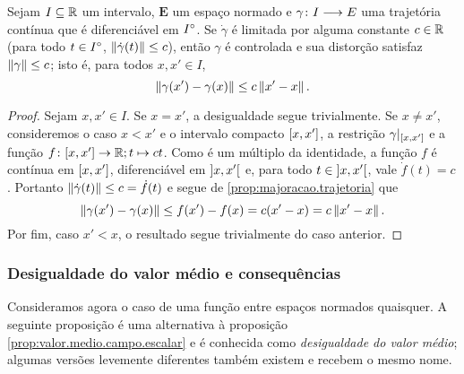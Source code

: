 \begin{proposition}
\label{prop:derivada.limitada.trajetoria.controlada}
Sejam $I \subseteq \mathbb{R}$ um intervalo, $\bm E$ um espaço normado e ${\gamma}\colon {I} \longrightarrow {E}$ uma trajetória contínua que é diferenciável em ${I}^\circ$. Se $\dot \gamma$ é limitada por alguma constante $c \in \mathbb{R}$ (para todo $t \in {I}^\circ$, $\left\Vert{\dot \gamma(t)}\right\Vert \leq c$), então $\gamma$ é controlada e sua distorção satisfaz $\left\Vert{\gamma}\right\Vert \leq c$; isto é, para todos $x,x' \in I$,
	\begin{equation*}
	\left\Vert{\gamma(x') - \gamma(x)}\right\Vert \leq c\left\Vert{x' - x}\right\Vert.
	\end{equation*}
\end{proposition}
\begin{proof}
Sejam $x,x' \in I$. Se $x=x'$, a desigualdade segue trivialmente. Se $x \neq x'$, consideremos o caso $x < x'$ e o intervalo compacto $\left[{x},{x'}\right]$, a restrição $\gamma|_{\left[{x},{x'}\right]}$ e a função ${f} \colon {\left[{x},{x'}\right]} \to {\mathbb{R}}; {t} \mapsto ct$. Como é um múltiplo da identidade, a função $f$ é contínua em $\left[{x},{x'}\right]$, diferenciável em $\left]{x},{x'}\right[$ e, para todo $t \in \left]{x},{x'}\right[$, vale $\dot f(t) = c$. Portanto $\left\Vert{\dot \gamma(t)}\right\Vert \leq c = \dot f(t)$ e segue de \ref{prop:majoracao.trajetoria} que
	\begin{equation*}
	\left\Vert{\gamma(x') - \gamma(x)}\right\Vert \leq f(x') - f(x) = c(x' - x) = c \left\Vert{x' - x}\right\Vert.
	\end{equation*}
Por fim, caso $x' < x$, o resultado segue trivialmente do caso anterior.
\end{proof}

\subsubsection{Desigualdade do valor médio e consequências}

Consideramos agora o caso de uma função entre espaços normados quaisquer. A seguinte proposição é uma alternativa à proposição \ref{prop:valor.medio.campo.escalar} e é conhecida como \textit{desigualdade do valor médio}; algumas versões levemente diferentes também existem e recebem o mesmo nome.

